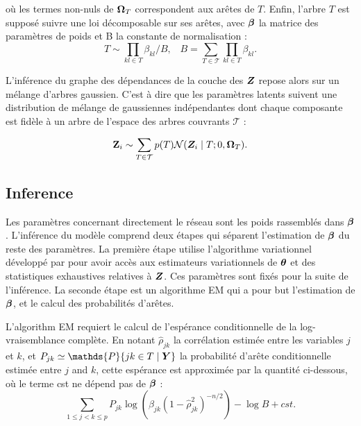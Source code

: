  où les termes non-nuls de ${\boldsymbol{\Omega}}_T$ correspondent aux arêtes de $T$.  Enfin, l'arbre $T$ est supposé suivre une loi décomposable sur ses arêtes, avec ${\boldsymbol{\beta}}$ la matrice des paramètres de poids et B la constante de normalisation :
 $$ T\sim \prod_{kl\in T} \beta_{kl} / B, \;\;\;  B= \sum_{T\in\mathcal{T}} \prod_{kl \in T} \beta_{kl}.$$
 
L'inférence du graphe des dépendances de la couche des ${\boldsymbol{Z}}$ repose alors sur un mélange d'arbres gaussien. C'est à dire que les paramètres latents suivent une distribution de mélange de gaussiennes indépendantes dont chaque composante est fidèle à un arbre de l'espace des arbres couvrants $\mathcal{T}$ :

$${\bf Z}_i \sim \sum_{T\in \mathcal{T}} p(T) \mathcal{N} ({\boldsymbol{Z}}_i\mid T; 0, {\boldsymbol{\Omega}}_T).$$


\subsection*{Inference}

Les paramètres concernant directement le réseau sont les poids rassemblés dans ${\boldsymbol{\beta}}$. L'inférence du modèle comprend deux étapes qui séparent  l'estimation de ${\boldsymbol{\beta}}$ du reste des paramètres. La première étape utilise l'algorithme variationnel développé par \citet{CMR18} pour avoir accès aux estimateurs variationnels de  ${\boldsymbol{\theta}}$ et des statistiques exhaustives relatives à ${\boldsymbol{Z}}$. Ces paramètres sont fixés pour la suite de l'inférence. La seconde étape est un algorithme EM qui a pour but l'estimation de ${\boldsymbol{\beta}}$, et le calcul des probabilités d'arêtes.

L'algorithm EM requiert le calcul de l'espérance conditionnelle de la log-vraisemblance complète. En notant $\widehat{\rho}_{jk}$ la corrélation estimée entre les variables $j$ et $k$, et $P_{jk}\simeq\mathds{P}\{jk\in T\mid \Ybf\}$ la probabilité d'arête conditionnelle estimée entre $j$ and $k$, cette espérance est approximée par la quantité ci-dessous, où le terme cst ne dépend pas de ${\boldsymbol{\beta}}$ :
$$\sum_{1\leq j < k \leq p} P_{jk} \log \left(\beta_{jk} (1-\widehat{\rho}_{jk}^2)^{-n/2} \right) -\log B + cst.$$


